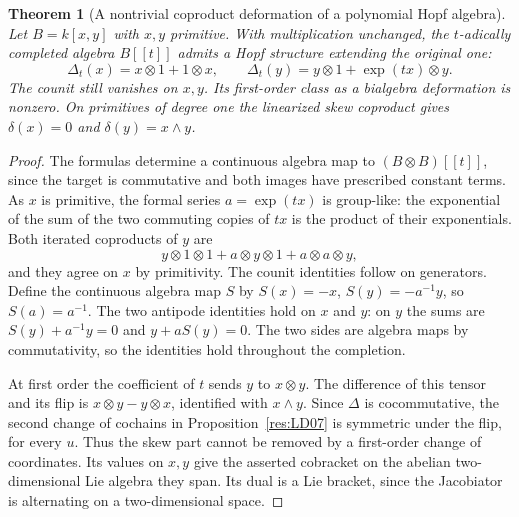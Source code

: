 \documentclass[11pt,oneside,openany]{book}
\newtheorem{theorem}{Theorem}[chapter]
\theoremstyle{definition}
\theoremstyle{remark}
\begin{document}
\begin{theorem}[A nontrivial coproduct deformation of a polynomial Hopf algebra]
\label{res:LD08}
Let \(B=k[x,y]\) with \(x,y\) primitive. With multiplication
unchanged, the \(t\)-adically completed algebra \(B[[t]]\)
admits a Hopf structure extending the original one:
\[
 \Delta_t(x)=x\otimes1+1\otimes x,\qquad
 \Delta_t(y)=y\otimes1+\exp(tx)\otimes y .
\]
The counit still vanishes on \(x,y\). Its first-order class
as a bialgebra deformation is nonzero. On primitives of
degree one the linearized skew coproduct gives
\(\delta(x)=0\) and \(\delta(y)=x\wedge y\).
\end{theorem}
\begin{proof}
The formulas determine a continuous algebra map to
\((B\otimes B)[[t]]\), since the target is commutative and
both images have prescribed constant terms. As \(x\) is
primitive, the formal series \(a=\exp(tx)\) is group-like:
the exponential of the sum of the two commuting copies of
\(tx\) is the product of their exponentials.
Both iterated coproducts of \(y\) are
\[
 y\otimes1\otimes1+a\otimes y\otimes1+a\otimes a\otimes y,
\]
and they agree on \(x\) by primitivity. The counit
identities follow on generators. Define the continuous algebra
map \(S\) by \(S(x)=-x\), \(S(y)=-a^{-1}y\), so \(S(a)=a^{-1}\).
The two antipode identities hold on \(x\) and \(y\):
on \(y\) the sums are \(S(y)+a^{-1}y=0\) and
\(y+aS(y)=0\). The two sides are algebra maps by commutativity,
so the identities hold throughout the completion.

At first order the coefficient of \(t\) sends \(y\) to
\(x\otimes y\). The difference of this tensor and its flip
is \(x\otimes y-y\otimes x\), identified with \(x\wedge y\).
Since
\(\Delta\) is cocommutative, the second change of cochains
in Proposition~\ref{res:LD07} is symmetric under the flip,
for every \(u\). Thus the skew part cannot be removed by
a first-order change of coordinates. Its values on \(x,y\)
give the asserted cobracket on the abelian two-dimensional
Lie algebra they span. Its dual is a Lie bracket, since the
Jacobiator is alternating on a two-dimensional space.
\end{proof}
\end{document}
